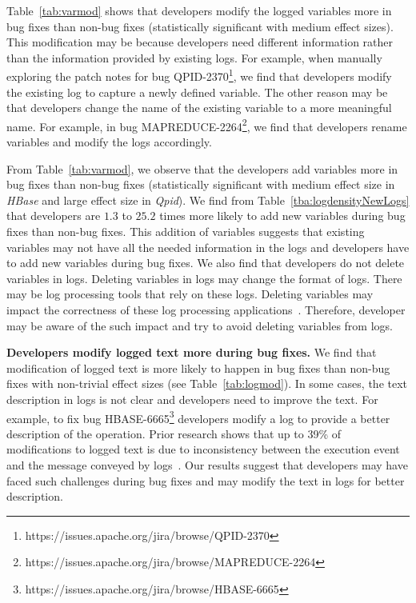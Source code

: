 Table~\ref{tab:varmod} shows that developers modify the logged variables more in bug fixes than non-bug fixes (statistically significant with medium effect sizes). This modification may be because developers need different information rather than the information provided by existing logs. For example, when manually exploring the patch notes for bug QPID-2370\footnote{https://issues.apache.org/jira/browse/QPID-2370}, we find that developers modify the existing log to capture a newly defined variable. The other reason may be that developers change the name of the existing variable to a more meaningful name. For example, in bug MAPREDUCE-2264\footnote{https://issues.apache.org/jira/browse/MAPREDUCE-2264}, we find that developers rename variables and modify the logs accordingly. %

From Table~\ref{tab:varmod}, we observe that the developers add variables more in bug fixes than non-bug fixes (statistically significant with medium effect size in \emph{HBase} and large effect size in \emph{Qpid}). We find from Table~\ref{tba:logdensityNewLogs} that developers are $1.3$ to $25.2$ times more likely to add new variables during bug fixes than non-bug fixes. This addition of variables suggests that existing variables may not have all the needed information in the logs and developers have to add new variables during bug fixes. We also find that developers do not delete variables in logs. Deleting variables in logs may change the format of logs. There may be log processing tools that rely on these logs. Deleting variables may impact the correctness of these log processing applications~\cite{IanWCRE}. Therefore, developer may be aware of the such impact and try to avoid deleting variables from logs.
 
 
\textbf{Developers modify logged text more during bug fixes.} We find that modification of logged text is more likely to happen in bug fixes than non-bug fixes with non-trivial effect sizes (see Table~\ref{tab:logmod}). In some cases, the text description in logs is not clear and developers need to improve the text. For example, to fix bug HBASE-6665\footnote{https://issues.apache.org/jira/browse/HBASE-6665} developers modify a log to provide a better description of the operation. Prior research shows that up to 39\% of modifications to logged text is due to inconsistency between the execution event and the message conveyed by logs~\cite{Characterizinglogs}. Our results suggest that developers may have faced such challenges during bug fixes and may modify the text in logs for better description. 

